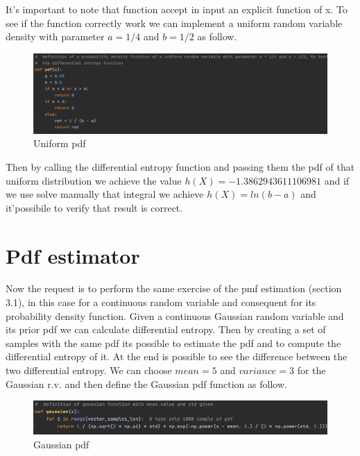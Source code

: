 \documentclass[12pt]{report}
\begin{document}
It's important to note that function accept in input an explicit function of x. To see if the function correctly work we can implement a uniform random variable density with parameter $a = 1/4$ and $b = 1/2$ as follow.

\begin{figure}[h!]
    \centering
    \includegraphics[width=15cm]{Pictures/Uniform pdf.png}
    \caption{Uniform pdf}
\end{figure}

Then by calling the differential entropy function and passing them the pdf of that uniform distribution we achieve the value $h(X) = -1.3862943611106981$ and if we use solve manually that integral we achieve $h(X) = ln(b-a) $ and it'possibile to verify that result is correct.

\section{Pdf estimator}
Now the request is to perform the same exercise of the pmf estimation (section 3.1), in this case for a continuous random variable and consequent for its probability density function. Given a continuous Gaussian random variable and its prior pdf we can calculate differential entropy. Then by creating a set of samples with the same pdf its possible to estimate the pdf and to compute the differential entropy of it. At the end is possible to see the difference between the two differential entropy. We can choose $mean = 5$ and $variance = 3$ for the Gaussian r.v. and then define the Gaussian pdf function as follow.

\begin{figure}[h!]
    \centering
    \includegraphics[width=15cm]{Pictures/Gaussian pdf.png}
    \caption{Gaussian pdf}
\end{figure}
\end{document}
